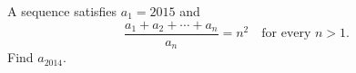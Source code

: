 A sequence satisfies $a_1=2015$ and
\[
\dfrac{a_1+a_2+\cdots+a_n}{a_n}=n^2\quad\text{for every } n>1 .
\]
Find $a_{2014}$.
